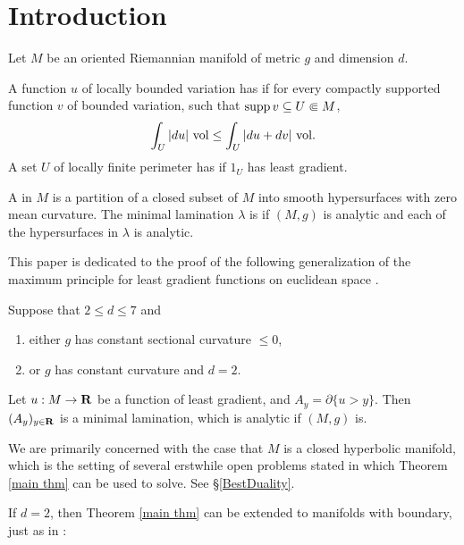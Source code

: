 \section{Introduction}
Let $M$ be an oriented Riemannian manifold of metric $g$ and dimension $d$.

\begin{definition}\label{main definitions}
A function $u$ of locally bounded variation has  if for every compactly supported function $v$ of bounded variation, such that $\operatorname{supp} v \subseteq U \Subset M$,
$$\int_U |du| ~\mathrm{vol} \leq \int_U |du + dv| ~\mathrm{vol}.$$
A set $U$ of locally finite perimeter has  if $1_U$ has least gradient.
\end{definition}

\begin{definition}
A  in $M$ is a partition of a closed subset of $M$ into smooth hypersurfaces with zero mean curvature.
The minimal lamination $\lambda$ is  if $(M, g)$ is analytic and each of the hypersurfaces in $\lambda$ is analytic.
\end{definition}

This paper is dedicated to the proof of the following generalization of the maximum principle for least gradient functions on euclidean space \cite[Proposition 3.4]{górny2017planar}.

\begin{theorem}\label{main thm}
Suppose that $2 \leq d \leq 7$ and
\begin{enumerate}
\item either $g$ has constant sectional curvature $\leq 0$,
\item or $g$ has constant curvature and $d = 2$.
\end{enumerate}
Let $u: M \to \mathbf{R}$ be a function of least gradient, and $A_y = \partial \{u > y\}$.
Then $(A_y)_{y \in \mathbf{R}}$ is a minimal lamination, which is analytic if $(M, g)$ is.
\end{theorem}

We are primarily concerned with the case that $M$ is a closed hyperbolic manifold, which is the setting of several erstwhile open problems stated in \cite[\S9]{daskalopoulos2020transverse} which Theorem \ref{main thm} can be used to solve. See \S\ref{BestDuality}.

If $d = 2$, then Theorem \ref{main thm} can be extended to manifolds with boundary, just as in \cite[Corollary 3.5]{górny2017planar}:

